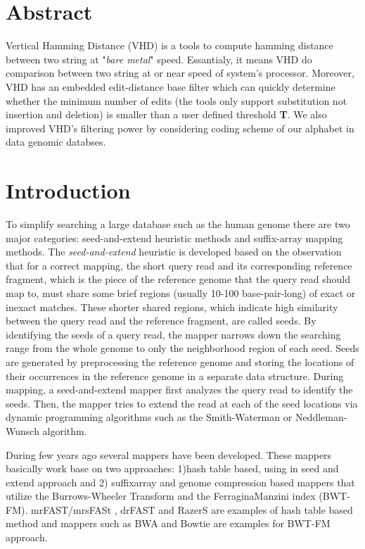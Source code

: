 \section{Abstract}
Vertical Hamming Distance (VHD) is a tools to compute hamming distance between two string at "\textit{bare metal}" speed. Essantialy, it means VHD do comparison between two string at or near speed of system's processor. Moreover, VHD has an embedded edit-distance base filter which can quickly determine whether the minimum number of edits (the tools only support substitution not insertion and deletion) is smaller than a user defined threshold \textbf{T}. We also improved VHD's filtering power by considering coding scheme of our alphabet in data genomic databses.

\section{Introduction}
To simplify searching a large database such as the human genome there are two major categories: seed-and-extend heuristic methods and suffix-array mapping methods. The \emph{seed-and-extend} heuristic is developed based on the observation that for a correct mapping, the short query read and its corresponding reference fragment, which is the piece of the reference genome that the query read should map to, must share some brief regions (usually 10-100 base-pair-long) of exact or inexact matches. These shorter shared regions, which indicate high similarity between the query read and the reference fragment, are called seeds. By identifying the seeds of a query read, the mapper narrows down the searching range from the whole genome to only the neighborhood region of each seed. Seeds are generated by preprocessing the reference genome and storing the locations of their occurrences in the reference genome in a separate data structure. During mapping, a seed-and-extend mapper first analyzes the query read to identify the seeds. Then, the mapper tries to extend the read at each of the seed locations via dynamic programming algorithms such as the Smith-Waterman \citep{smith1981identification} or Neddleman-Wunsch \citep{needleman} algorithm.

During few years ago several mappers have been developed. These mappers basically work base on two approaches: 1)hash table based, using in seed and extend approach and 2) suffixarray and genome compression based mappers that utilize the Burrows-Wheeler Transform and the FerraginaManzini index (BWT-FM).  mrFAST/mrsFASt \cite{mrfast}\cite{mrsfast}, drFAST\cite{drfast} and RazerS\cite{razers} are examples of hash table based method and mappers such as BWA\cite{bwa} and Bowtie\cite{bowtie} are examples for BWT-FM approach. 

